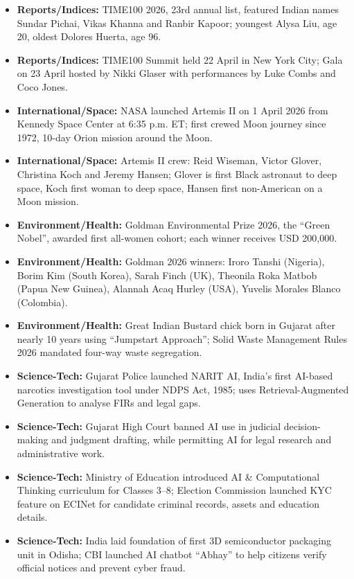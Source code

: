 \documentclass[10pt,a4paper]{article}
\begin{document}
\begin{itemize}
    \item \textbf{Reports/Indices:} TIME100 2026, 23rd annual list, featured Indian names Sundar Pichai, Vikas Khanna and Ranbir Kapoor; youngest Alysa Liu, age 20, oldest Dolores Huerta, age 96.
    \item \textbf{Reports/Indices:} TIME100 Summit held 22 April in New York City; Gala on 23 April hosted by Nikki Glaser with performances by Luke Combs and Coco Jones.
    \item \textbf{International/Space:} NASA launched Artemis II on 1 April 2026 from Kennedy Space Center at 6:35 p.m. ET; first crewed Moon journey since 1972, 10-day Orion mission around the Moon.
    \item \textbf{International/Space:} Artemis II crew: Reid Wiseman, Victor Glover, Christina Koch and Jeremy Hansen; Glover is first Black astronaut to deep space, Koch first woman to deep space, Hansen first non-American on a Moon mission.
    \item \textbf{Environment/Health:} Goldman Environmental Prize 2026, the ``Green Nobel'', awarded first all-women cohort; each winner receives USD 200,000.
    \item \textbf{Environment/Health:} Goldman 2026 winners: Iroro Tanshi (Nigeria), Borim Kim (South Korea), Sarah Finch (UK), Theonila Roka Matbob (Papua New Guinea), Alannah Acaq Hurley (USA), Yuvelis Morales Blanco (Colombia).
    \item \textbf{Environment/Health:} Great Indian Bustard chick born in Gujarat after nearly 10 years using ``Jumpstart Approach''; Solid Waste Management Rules 2026 mandated four-way waste segregation.
    \item \textbf{Science-Tech:} Gujarat Police launched NARIT AI, India's first AI-based narcotics investigation tool under NDPS Act, 1985; uses Retrieval-Augmented Generation to analyse FIRs and legal gaps.
    \item \textbf{Science-Tech:} Gujarat High Court banned AI use in judicial decision-making and judgment drafting, while permitting AI for legal research and administrative work.
    \item \textbf{Science-Tech:} Ministry of Education introduced AI \& Computational Thinking curriculum for Classes 3--8; Election Commission launched KYC feature on ECINet for candidate criminal records, assets and education details.
    \item \textbf{Science-Tech:} India laid foundation of first 3D semiconductor packaging unit in Odisha; CBI launched AI chatbot ``Abhay'' to help citizens verify official notices and prevent cyber fraud.

\end{itemize}
\end{document}
